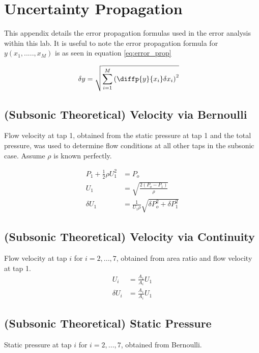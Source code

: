 \documentclass[runningheads]{llncs}
\begin{document}
\section{Uncertainty Propagation}

This appendix details the error propagation formulas used in the error analysis within this lab. It is useful to note the error propagation formula for $y(x_1,.....,x_M)$ is as seen in equation \ref{eq:error_prop}

\begin{align}
    \delta y &= \sqrt{\sum_{i=1}^M \left( \diffp{y}{{x_i}} \delta x_i\right)^2}
    \label{eq:error_prop}
\end{align}

\subsection{(Subsonic Theoretical) Velocity via Bernoulli}

Flow velocity at tap 1, obtained from the static pressure at tap 1 and the total pressure, was used to determine flow conditions at all other taps in the subsonic case. Assume $\rho$ is known perfectly.

\begin{align*}
    P_1 + \frac{1}{2}\rho U_1^2 &= P_o\\
    U_1 &= \sqrt{\frac{2(P_o - P_1)}{\rho}}\\
    \delta U_1 &= \frac{1}{U_1 \rho}\sqrt{\delta P_o^2 + \delta P_1^2}
\end{align*}

\subsection{(Subsonic Theoretical) Velocity via Continuity}

Flow velocity at tap $i$ for $i = {2, ..., 7}$, obtained from area ratio and flow velocity at tap 1.
\begin{align*}
    U_i &= \frac{A_1}{A_i} U_1\\
    \delta U_i &= \frac{A_1}{A_i} U_1
\end{align*}

\subsection{(Subsonic Theoretical) Static Pressure}

Static pressure at tap $i$ for $i = {2, ..., 7}$, obtained from Bernoulli.
\end{document}
